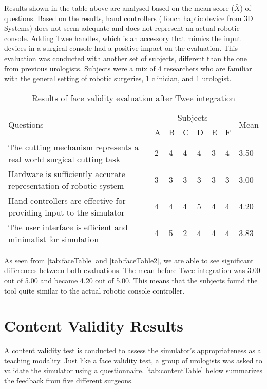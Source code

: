 Results shown in the table above are analysed based on the mean score ($\bar{X}$) of questions. Based on the results, hand controllers (Touch haptic device from 3D Systems) does not seem adequate and does not represent an actual robotic console. Adding Twee handles, which is an accessory that mimics the input devices in a surgical console had a positive impact on the evaluation. This evaluation was conducted with another set of subjects, different than the one from previous urologists. Subjects were a mix of 4 researchers who are familiar with the general setting of robotic surgeries, 1 clinician, and 1 urologist.


\begin{table}
\small
\centering
\begin{tabular}{p{6cm}p{0.5cm}p{0.5cm}p{0.5cm}p{0.5cm}p{0.5cm}p{0.5cm}p{0.8cm}}
  \multirow{2}{4em}{Questions} & \multicolumn{6}{c}{Subjects} & \multirow{2}{4em}{Mean}\\
  \cmidrule{2-7}
  & A & B & C & D & E & F &\\
  \toprule
  The cutting mechanism represents a real world surgical cutting task & 2& 4& 4& 4 & 3& 4 & 3.50\\
  \midrule
  Hardware is sufficiently accurate representation of robotic system
  & 3& 3& 3 & 3 & 3 & 3 & 3.00\\
  \midrule
  Hand controllers are effective for providing input to the simulator
  & 4 & 4 & 4& 5& 4 & 4 & 4.20\\
  \midrule
  The user interface is efficient and minimalist for simulation  & 4 & 5& 2 & 4 & 4& 4 & 3.83\\
  \bottomrule
\end{tabular}
\caption{Results of face validity evaluation after Twee integration}\label{tab:faceTable2}
\end{table}

As seen from \autoref{tab:faceTable} and \autoref{tab:faceTable2}, we are able to see significant differences between both evaluations. The mean before Twee integration was 3.00 out of 5.00 and became 4.20 out of 5.00. This means that the subjects found the tool quite similar to the actual robotic console controller.

\section{Content Validity Results}\label{sec:content}
A content validity test is conducted to assess the simulator's appropriateness as a teaching modality. Just like a face validity test, a group of urologists was asked to validate the simulator using a questionnaire. \autoref{tab:contentTable} below summarizes the feedback from five different surgeons.

